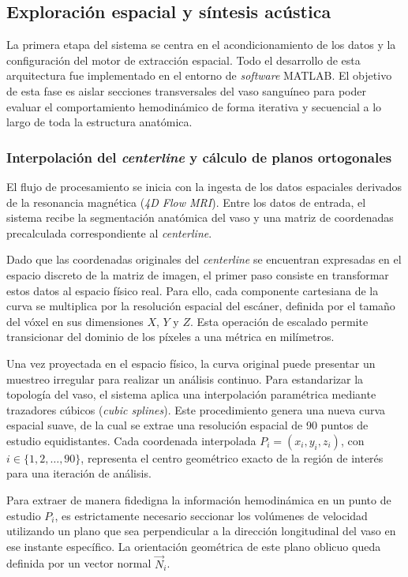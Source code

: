 \subsection{Exploración espacial y síntesis acústica}

La primera etapa del sistema se centra en el acondicionamiento de los datos y la configuración del motor de extracción espacial. Todo el desarrollo de esta arquitectura fue implementado en el entorno de \textit{software} MATLAB. El objetivo de esta fase es aislar secciones transversales del vaso sanguíneo para poder evaluar el comportamiento hemodinámico de forma iterativa y secuencial a lo largo de toda la estructura anatómica.

\subsubsection{Interpolación del \textit{centerline} y cálculo de planos ortogonales}

El flujo de procesamiento se inicia con la ingesta de los datos espaciales derivados de la resonancia magnética (\textit{4D Flow MRI}). Entre los datos de entrada, el sistema recibe la segmentación anatómica del vaso y una matriz de coordenadas precalculada correspondiente al \textit{centerline}.

Dado que las coordenadas originales del \textit{centerline} se encuentran expresadas en el espacio discreto de la matriz de imagen, el primer paso consiste en transformar estos datos al espacio físico real. Para ello, cada componente cartesiana de la curva se multiplica por la resolución espacial del escáner, definida por el tamaño del vóxel en sus dimensiones $X$, $Y$ y $Z$. Esta operación de escalado permite transicionar del dominio de los píxeles a una métrica en milímetros.

Una vez proyectada en el espacio físico, la curva original puede presentar un muestreo irregular para realizar un análisis continuo. Para estandarizar la topología del vaso, el sistema aplica una interpolación paramétrica mediante trazadores cúbicos (\textit{cubic splines}). Este procedimiento genera una nueva curva espacial suave, de la cual se extrae una resolución espacial de 90 puntos de estudio equidistantes. Cada coordenada interpolada $P_i = (x_i, y_i, z_i)$, con $i \in \{1, 2, \dots, 90\}$, representa el centro geométrico exacto de la región de interés para una iteración de análisis.

Para extraer de manera fidedigna la información hemodinámica en un punto de estudio $P_i$, es estrictamente necesario seccionar los volúmenes de velocidad utilizando un plano que sea perpendicular a la dirección longitudinal del vaso en ese instante específico. La orientación geométrica de este plano oblicuo queda definida por un vector normal $\vec{N}_i$. 
 

